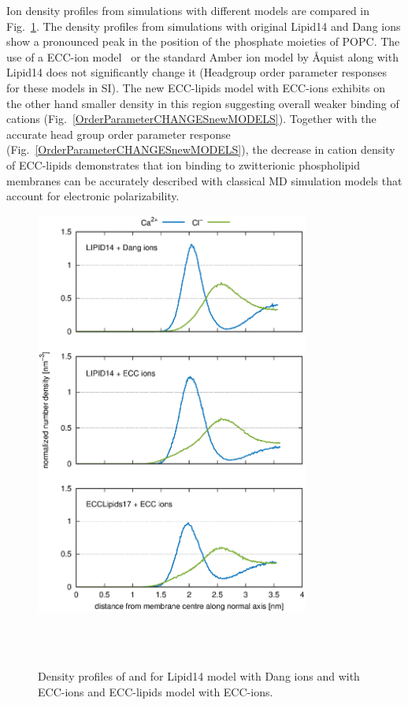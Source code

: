 \documentclass[aip,jcp,twocolumn]{revtex4}
\begin{document}
Ion density profiles from simulations with different models are compared in Fig.~\ref{fig:cacl-dens}.
The density profiles from simulations with original Lipid14 \cite{dickson14} and Dang ions \cite{smith94,chang1999,dang2006} 
show a pronounced peak in the position of the phosphate moieties of POPC. 
The use of a ECC-ion model~\cite{kohagen14,kohagen16} 
or the standard Amber ion model by \AA{quist} 
along with Lipid14 does not significantly change it 
(Headgroup order parameter responses for these models in SI).
The new ECC-lipids model with ECC-ions exhibits on the other hand smaller density in this region 
suggesting overall weaker binding of cations (Fig.~\ref{OrderParameterCHANGESnewMODELS}). 
Together with the accurate head group order parameter response (Fig.~\ref{OrderParameterCHANGESnewMODELS}),
the decrease in cation density of ECC-lipids demonstrates that 
ion binding to zwitterionic phospholipid membranes can be accurately
described with classical MD simulation models that account for electronic polarizability.

\begin{figure}[]
  \centering
  \includegraphics[width=9.0cm,angle=0]{../Fig/CAdensities.eps}
  \caption{\label{fig:cacl-dens}
    Density profiles of  and  for Lipid14 model with Dang ions
    and with ECC-ions and ECC-lipids model with ECC-ions. }
   \\
   \\
\end{figure}
\end{document}
